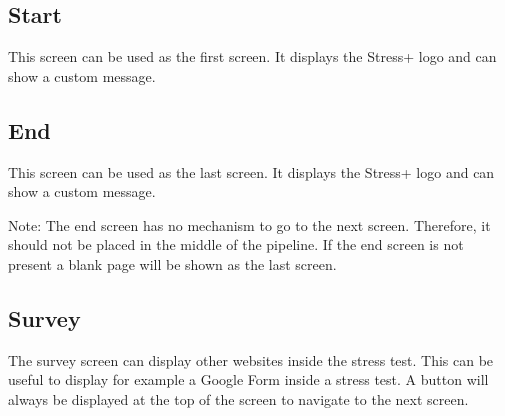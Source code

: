 \subsection{Start}
\label{sec:screens-start}
This screen can be used as the first screen.
It displays the Stress+ logo and can show a custom message.

\subsection{End}
\label{sec:screens-end}
This screen can be used as the last screen.
It displays the Stress+ logo and can show a custom message.

Note: The end screen has no mechanism to go to the next screen. 
Therefore, it should not be placed in the middle of the pipeline.
If the end screen is not present a blank page will be shown as the last screen.

\subsection{Survey}
\label{sec:screens-survey}
The survey screen can display other websites inside the stress test. 
This can be useful to display for example a Google Form inside a stress test.
A button will always be displayed at the top of the screen to navigate to the next screen.
